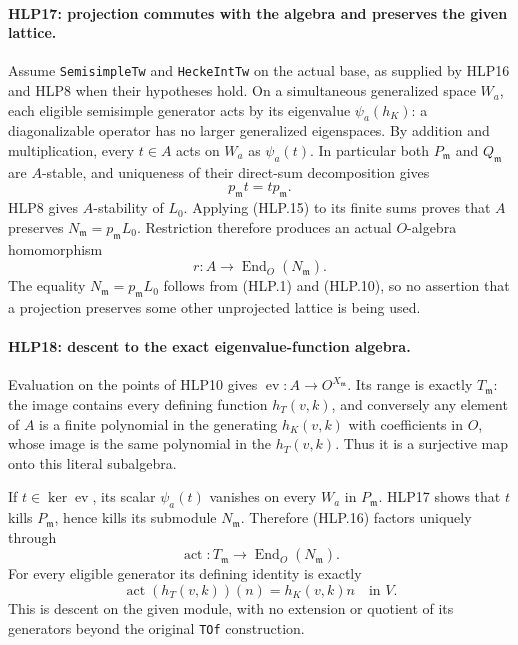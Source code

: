 \paragraph{HLP17: projection commutes with the algebra and preserves the given lattice.}
\label{claim:HLP17}
Assume \texttt{Semisimple\allowbreak Tw} and \texttt{Hecke\allowbreak Int\allowbreak Tw} on the actual
base, as supplied by HLP16 and HLP8 when their hypotheses hold.
On a simultaneous generalized space \(W_a\), each eligible
semisimple generator acts by its eigenvalue \(\psi_a(h_K)\):
a diagonalizable operator has no larger generalized eigenspaces.
By addition and multiplication, every \(t\in A\) acts on
\(W_a\) as \(\psi_a(t)\). In particular both
\(P_{\mathfrak m}\) and \(Q_{\mathfrak m}\) are \(A\)-stable,
and uniqueness of their direct-sum decomposition gives
\[
                  p_{\mathfrak m}t=tp_{\mathfrak m}.  \tag{HLP.15}
\]
HLP8 gives \(A\)-stability of \(L_0\). Applying (HLP.15) to its
finite sums proves that \(A\) preserves
\(N_{\mathfrak m}=p_{\mathfrak m}L_0\). Restriction therefore
produces an actual \(O\)-algebra homomorphism
\[
          r:A\longrightarrow\operatorname{End}_O(N_{\mathfrak m}).
                                                               \tag{HLP.16}
\]
The equality \(N_{\mathfrak m}=p_{\mathfrak m}L_0\) follows from
(HLP.1) and (HLP.10), so no assertion that a projection preserves
some other unprojected lattice is being used.

\paragraph{HLP18: descent to the exact eigenvalue-function algebra.}
\label{claim:HLP18}
Evaluation on the points of HLP10 gives
\(\operatorname{ev}:A\to O^{X_{\mathfrak m}}\).
Its range is exactly \(T_{\mathfrak m}\): the image contains every
defining function \(h_T(v,k)\), and conversely any element of
\(A\) is a finite polynomial in the generating \(h_K(v,k)\)
with coefficients in \(O\), whose image is the same polynomial
in the \(h_T(v,k)\). Thus it is a surjective map onto this literal
subalgebra.

If \(t\in\ker\operatorname{ev}\), its scalar \(\psi_a(t)\)
vanishes on every \(W_a\) in \(P_{\mathfrak m}\). HLP17 shows
that \(t\) kills \(P_{\mathfrak m}\), hence kills its submodule
\(N_{\mathfrak m}\). Therefore (HLP.16) factors uniquely through
\[
 \operatorname{act}:T_{\mathfrak m}
                       \longrightarrow\operatorname{End}_O(N_{\mathfrak m}).
                                                               \tag{HLP.17}
\]
For every eligible generator its defining identity is exactly
\[
 \operatorname{act}(h_T(v,k))(n)
                    =h_K(v,k)n\quad\text{in }V.       \tag{HLP.18}
\]
This is descent on the given module, with no extension or quotient
of its generators beyond the original \texttt{TOf} construction.


